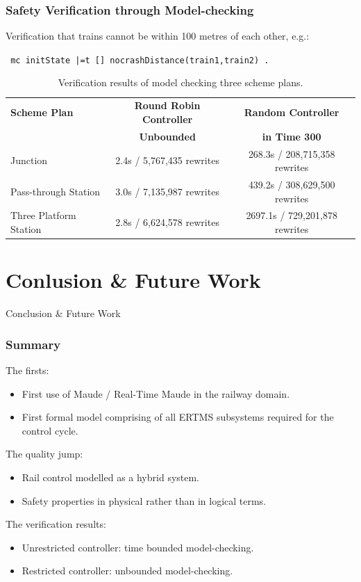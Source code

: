 \documentclass{beamer}
\begin{document}
\begin{frame}
\frametitle{Safety Verification through
  Model-checking}
Verification that trains cannot be within 100 metres of each other, e.g.:
\begin{center}
\texttt{
mc initState |=t [] nocrashDistance(train1,train2) . 
}
\end{center}
\begin{table}
\centering
{\footnotesize
  \begin{tabular}{|l|c|c|}
    \hline 
    \textbf{Scheme Plan} & \textbf{Round Robin Controller} &
    \textbf{Random Controller} \\
    & \textbf{Unbounded} & \textbf{in Time 300} \\
    \hline \hline
    Junction  & 2.4s / 5,767,435 rewrites & \hphantom{1}268.3s / 208,715,358 rewrites \\
    Pass-through Station & 3.0s  / 7,135,987 rewrites & \hphantom{1}439.2s / 308,629,500 rewrites \\
    Three Platform Station & 2.8s / 6,624,578 rewrites & 2697.1s / 729,201,878 rewrites \\
    \hline
 \end{tabular}
}
\caption{Verification results of model checking three scheme plans.}
\end{table}


\end{frame}

\section{Conlusion \& Future Work}

\begin{frame}
\begin{center}
{\Large Conclusion \& Future Work}
\end{center}
\end{frame}

\begin{frame}
\frametitle{Summary}

The firsts:
\begin{itemize}
\item First use of Maude / Real-Time Maude in the railway domain.
\item First formal model comprising of all ERTMS subsystems required
  for the control cycle.
\end{itemize}

The quality jump: 
\begin{itemize}
\item Rail control modelled as a hybrid system.
\item Safety properties in physical rather than in logical terms.
\end{itemize}

The verification results:
\begin{itemize}
\item Unrestricted controller: time bounded model-checking.
\item Restricted controller: unbounded model-checking.
\end{itemize}
\end{frame}
\end{document}
